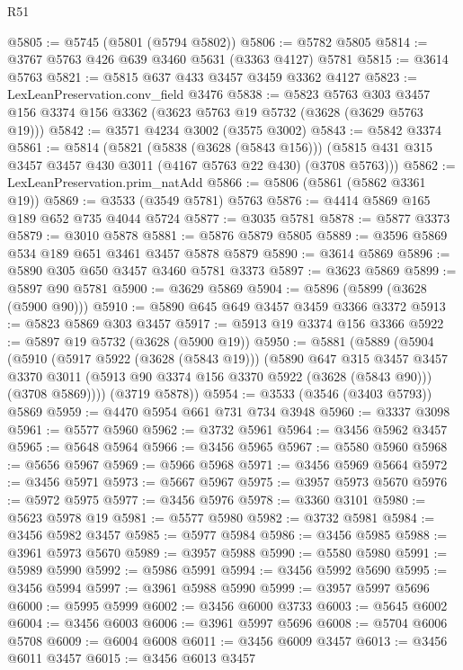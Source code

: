 \begin{lexlean}{R51}
\begin{coremodule}
@5805 := @5745 (@5801 (@5794 @5802))
@5806 := @5782 @5805
@5814 := @3767 @5763 @426 @639 @3460 @5631 (@3363 @4127) @5781
@5815 := @3614 @5763
@5821 := @5815 @637 @433 @3457 @3459 @3362 @4127
@5823 := LexLeanPreservation.conv_field @3476
@5838 := @5823
    @5763
    @303
    @3457
    @156
    @3374
    @156
    @3362
    (@3623 @5763 @19 @5732 (@3628 (@3629 @5763 @19)))
@5842 := @3571 @4234 @3002 (@3575 @3002)
@5843 := @5842 @3374
@5861 := @5814
    (@5821
      (@5838 (@3628 (@5843 @156)))
      (@5815 @431 @315 @3457 @3457 @430 @3011 (@4167 @5763 @22 @430) (@3708 @5763)))
@5862 := LexLeanPreservation.prim_natAdd
@5866 := @5806 (@5861 (@5862 @3361 @19))
@5869 := @3533 (@3549 @5781) @5763
@5876 := @4414 @5869 @165 @189 @652 @735 @4044 @5724
@5877 := @3035 @5781
@5878 := @5877 @3373
@5879 := @3010 @5878
@5881 := @5876 @5879 @5805
@5889 := @3596 @5869 @534 @189 @651 @3461 @3457 @5878 @5879
@5890 := @3614 @5869
@5896 := @5890 @305 @650 @3457 @3460 @5781 @3373
@5897 := @3623 @5869
@5899 := @5897 @90 @5781
@5900 := @3629 @5869
@5904 := @5896 (@5899 (@3628 (@5900 @90)))
@5910 := @5890 @645 @649 @3457 @3459 @3366 @3372
@5913 := @5823 @5869 @303 @3457
@5917 := @5913 @19 @3374 @156 @3366
@5922 := @5897 @19 @5732 (@3628 (@5900 @19))
@5950 := @5881
    (@5889
      (@5904
        (@5910
          (@5917 @5922 (@3628 (@5843 @19)))
          (@5890
            @647
            @315
            @3457
            @3457
            @3370
            @3011
            (@5913 @90 @3374 @156 @3370 @5922 (@3628 (@5843 @90)))
            (@3708 @5869))))
      (@3719 @5878))
@5954 := @3533 (@3546 (@3403 @5793)) @5869
@5959 := @4470 @5954 @661 @731 @734 @3948
@5960 := @3337 @3098
@5961 := @5577 @5960
@5962 := @3732 @5961
@5964 := @3456 @5962 @3457
@5965 := @5648 @5964
@5966 := @3456 @5965
@5967 := @5580 @5960
@5968 := @5656 @5967
@5969 := @5966 @5968
@5971 := @3456 @5969 @5664
@5972 := @3456 @5971
@5973 := @5667 @5967
@5975 := @3957 @5973 @5670
@5976 := @5972 @5975
@5977 := @3456 @5976
@5978 := @3360 @3101
@5980 := @5623 @5978 @19
@5981 := @5577 @5980
@5982 := @3732 @5981
@5984 := @3456 @5982 @3457
@5985 := @5977 @5984
@5986 := @3456 @5985
@5988 := @3961 @5973 @5670
@5989 := @3957 @5988
@5990 := @5580 @5980
@5991 := @5989 @5990
@5992 := @5986 @5991
@5994 := @3456 @5992 @5690
@5995 := @3456 @5994
@5997 := @3961 @5988 @5990
@5999 := @3957 @5997 @5696
@6000 := @5995 @5999
@6002 := @3456 @6000 @3733
@6003 := @5645 @6002
@6004 := @3456 @6003
@6006 := @3961 @5997 @5696
@6008 := @5704 @6006 @5708
@6009 := @6004 @6008
@6011 := @3456 @6009 @3457
@6013 := @3456 @6011 @3457
@6015 := @3456 @6013 @3457

\end{coremodule}
\end{lexlean}
